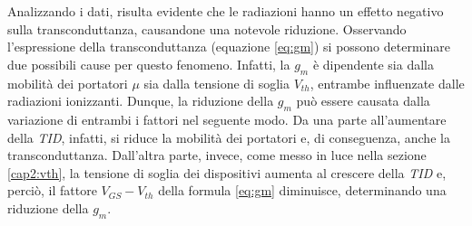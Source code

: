 Analizzando i dati, risulta evidente che le radiazioni hanno un effetto negativo sulla transconduttanza, causandone una notevole riduzione. Osservando l'espressione della transconduttanza (equazione \ref{eq:gm}) si possono determinare due possibili cause per questo fenomeno. Infatti, la $g_m$ è dipendente sia dalla mobilità dei portatori $\mu$ sia dalla tensione di soglia $V_{th}$, entrambe influenzate dalle radiazioni ionizzanti. Dunque, la riduzione della $g_m$ può essere causata dalla variazione di entrambi i fattori nel seguente modo. Da una parte all'aumentare della \textit{TID}, infatti, si riduce la mobilità dei portatori e, di conseguenza, anche la transconduttanza. Dall'altra parte, invece, come messo in luce nella sezione \ref{cap2:vth}, la tensione di soglia dei dispositivi aumenta al crescere della \textit{TID} e, perciò, il fattore $V_{GS}-V_{th}$ della formula \ref{eq:gm} diminuisce, determinando una riduzione della $g_m$.

\clearpage

